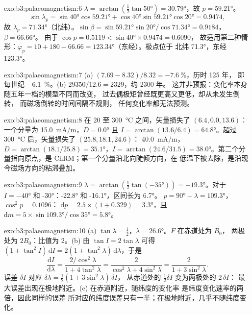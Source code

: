 \begin{solution}{exo:b3:palaeomagnetism:6}
$\lambda = \arctan(\tfrac12\tan\ang{50}) = \ang{30.79}$，故 $p = \ang{59.21}$。
\[\sin\lambda_p = \sin\ang{40}\cos\ang{59.21} + \cos\ang{40}\sin\ang{59.21}
\cos\ang{20} = 0.9474,\] 故 $\lambda_p = \ang{71.34}$（北纬）。$\sin\beta =
\sin\ang{59.21}\sin\ang{20}/\cos\ang{71.34} = 0.9184$，$\beta = \ang{66.66}$。
由于 $\cos p = 0.5119 < \sin\ang{40}\times0.9474 = 0.6090$，
故适用第二种情形：$\varphi_p = 10 + 180 - 66.66 = \ang{123.34}$（东经）。极点位于
北纬 \ang{71.3}，东经 \ang{123.3}。
\end{solution}

\begin{solution}{exo:b3:palaeomagnetism:7}
(a) $(7.69 - 8.32)/8.32 = \qty{-7.6}{\percent}$，历时 125 年，
即每世纪 \qty{-6.1}{\percent}。(b) $29350/12.6 = 2329$，约 2300 年。
这并非预报：变化率本身随五年一档的模型不同而改变，
过去偶极矩曾经既更高又更低，却从未发生倒转，
而磁场倒转的时间间隔不规则，
任何变化率都无法预测。
\end{solution}

\begin{solution}{exo:b3:palaeomagnetism:8}
在 20 至 \qty{300}{\celsius} 之间，矢量损失了 $(6.4, 0.0, 13.6)$：
一个分量为 \qty{15.0}{mA/m}，$D = \ang{0.0}$ 且
$I = \arctan(13.6/6.4) = \ang{64.8}$。超过 \qty{300}{\celsius} 后，矢量损失了 $(25.8, 18.1, 24.6)$：
\qty{40.0}{mA/m}，$D = \arctan(18.1/25.8) = \ang{35.1}$，$I =
\arctan(24.6/31.5) = \ang{38.0}$。第二个分量指向原点，是
 ChRM；第一个分量沿北向陡倾方向，在
低温下被去除，是沿现今磁场方向的粘滞叠加。
\end{solution}

\begin{solution}{exo:b3:palaeomagnetism:9}
$\lambda = \arctan(\tfrac12\tan(\ang{-35})) = \ang{-19.3}$。对于 $I = \ang{-40}$
和 \ang{-30}：\ang{-22.8} 和 \ang{-16.1}，区间长为 \ang{6.7}。
$p = \ang{90} - \lambda = \ang{109.3}$，$\cos^2p = 0.1096$：
$\mathrm dp = 2.5\times(1 + 0.329) = \ang{3.3}$，且 $\mathrm dm =
5\times\sin\ang{109.3}/\cos\ang{35} = \ang{5.8}$。
\end{solution}

\begin{solution}{exo:b3:palaeomagnetism:10}
(a) $\tan\lambda = \tfrac12$，$\lambda = \ang{26.6}$。$F$ 在赤道处为 $B_0$，
两极处为 $2B_0$：比值为 2。(b) 由 $\tan I = 2\tan\lambda$
可得 $(1 + \tan^2I)\,\mathrm dI = 2(1 + \tan^2\lambda)\,\mathrm d\lambda$，于是
\[
  \frac{\mathrm dI}{\mathrm d\lambda} = \frac{2/\cos^2\lambda}{1 + 4\tan^2\lambda}
  = \frac{2}{\cos^2\lambda + 4\sin^2\lambda} = \frac{2}{1 + 3\sin^2\lambda}.
\]
误差 $\delta I$ 对应 $\delta\lambda = \tfrac12(1 + 3\sin^2\lambda)\,\delta I$，
从赤道处的 $\tfrac12\delta I$ 变为两极处的 $2\,\delta I$：
最大误差出现在极地附近。(c) 在赤道附近，随纬度的变化率
是纬度变化速率的两倍，因此同样的误差
所对应的纬度误差只有一半；在极地附近，几乎不随纬度变化。
\end{solution}

